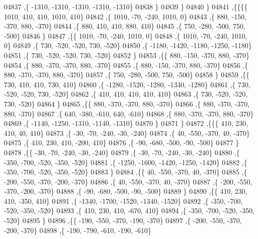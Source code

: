 \begin{DoxyCode}
04837     ,\{ -1310, -1310, -1310, -1310, -1310\}
04838     \}
04839    \}
04840   \}
04841  ,\{\{\{\{  1010,   410,   410,  1010,   410\}
04842     ,\{  1010,   -70,  -240,  1010,     0\}
04843     ,\{   880,  -150,  -370,   880,  -370\}
04844     ,\{   880,   410,   410,   880,   410\}
04845     ,\{   750,  -280,  -500,   750,  -500\}
04846     \}
04847    ,\{\{  1010,   -70,  -240,  1010,     0\}
04848     ,\{  1010,   -70,  -240,  1010,     0\}
04849     ,\{   730,  -520,  -520,   730,  -520\}
04850     ,\{ -1180, -1420, -1180, -1250, -1180\}
04851     ,\{   730,  -520,  -520,   730,  -520\}
04852     \}
04853    ,\{\{   880,  -150,  -370,   880,  -370\}
04854     ,\{   880,  -370,  -370,   880,  -370\}
04855     ,\{   880,  -150,  -370,   880,  -370\}
04856     ,\{   880,  -370,  -370,   880,  -370\}
04857     ,\{   750,  -280,  -500,   750,  -500\}
04858     \}
04859    ,\{\{   730,   410,   410,   730,   410\}
04860     ,\{ -1280, -1520, -1280, -1340, -1280\}
04861     ,\{   730,  -520,  -520,   730,  -520\}
04862     ,\{   410,   410,   410,   410,   410\}
04863     ,\{   730,  -520,  -520,   730,  -520\}
04864     \}
04865    ,\{\{   880,  -370,  -370,   880,  -370\}
04866     ,\{   880,  -370,  -370,   880,  -370\}
04867     ,\{   640,  -380,  -610,   640,  -610\}
04868     ,\{   880,  -370,  -370,   880,  -370\}
04869     ,\{ -1140, -1250, -1310, -1140, -1310\}
04870     \}
04871    \}
04872   ,\{\{\{   410,   230,   410,    40,   410\}
04873     ,\{   -30,   -70,  -240,   -30,  -240\}
04874     ,\{    40,  -550,  -370,    40,  -370\}
04875     ,\{   410,   230,   410,  -200,   410\}
04876     ,\{   -90,  -680,  -500,   -90,  -500\}
04877     \}
04878    ,\{\{   -30,   -70,  -240,   -30,  -240\}
04879     ,\{   -30,   -70,  -240,   -30,  -240\}
04880     ,\{  -350,  -700,  -520,  -350,  -520\}
04881     ,\{ -1250, -1600, -1420, -1250, -1420\}
04882     ,\{  -350,  -700,  -520,  -350,  -520\}
04883     \}
04884    ,\{\{    40,  -550,  -370,    40,  -370\}
04885     ,\{  -200,  -550,  -370,  -200,  -370\}
04886     ,\{    40,  -550,  -370,    40,  -370\}
04887     ,\{  -200,  -550,  -370,  -200,  -370\}
04888     ,\{   -90,  -680,  -500,   -90,  -500\}
04889     \}
04890    ,\{\{   410,   230,   410,  -350,   410\}
04891     ,\{ -1340, -1700, -1520, -1340, -1520\}
04892     ,\{  -350,  -700,  -520,  -350,  -520\}
04893     ,\{   410,   230,   410,  -670,   410\}
04894     ,\{  -350,  -700,  -520,  -350,  -520\}
04895     \}
04896    ,\{\{  -190,  -550,  -370,  -190,  -370\}
04897     ,\{  -200,  -550,  -370,  -200,  -370\}
04898     ,\{  -190,  -790,  -610,  -190,  -610\}

\end{DoxyCode}
